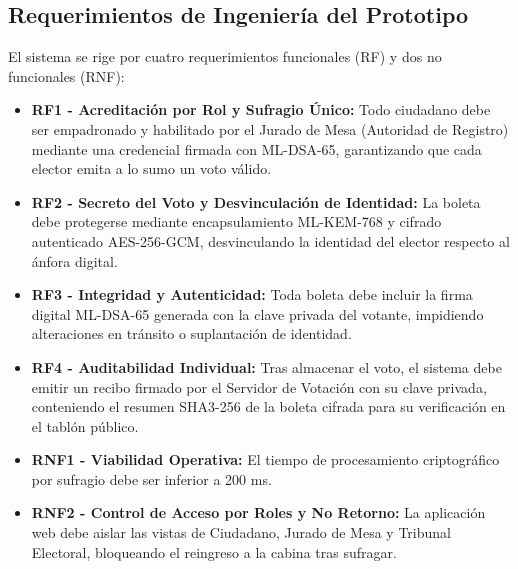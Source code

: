 \subsection{Requerimientos de Ingeniería del Prototipo}
\label{subsec:requerimientos_ingenieria}

El sistema se rige por cuatro requerimientos funcionales (RF) y dos no funcionales (RNF):

\begin{itemize}
	\item \textbf{RF1 - Acreditación por Rol y Sufragio Único:} Todo ciudadano debe ser empadronado y habilitado por el Jurado de Mesa (Autoridad de Registro) mediante una credencial firmada con ML-DSA-65, garantizando que cada elector emita a lo sumo un voto válido.
	\item \textbf{RF2 - Secreto del Voto y Desvinculación de Identidad:} La boleta debe protegerse mediante encapsulamiento ML-KEM-768 y cifrado autenticado AES-256-GCM, desvinculando la identidad del elector respecto al ánfora digital.
	\item \textbf{RF3 - Integridad y Autenticidad:} Toda boleta debe incluir la firma digital ML-DSA-65 generada con la clave privada del votante, impidiendo alteraciones en tránsito o suplantación de identidad.
	\item \textbf{RF4 - Auditabilidad Individual:} Tras almacenar el voto, el sistema debe emitir un recibo firmado por el Servidor de Votación con su clave privada, conteniendo el resumen SHA3-256 de la boleta cifrada para su verificación en el tablón público.
	\item \textbf{RNF1 - Viabilidad Operativa:} El tiempo de procesamiento criptográfico por sufragio debe ser inferior a 200 ms.
	\item \textbf{RNF2 - Control de Acceso por Roles y No Retorno:} La aplicación web debe aislar las vistas de Ciudadano, Jurado de Mesa y Tribunal Electoral, bloqueando el reingreso a la cabina tras sufragar.
\end{itemize}
